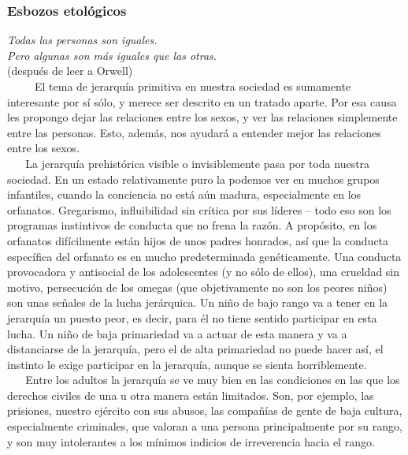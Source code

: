 \protect\hypertarget{M23}{}{}

\hypertarget{esbozos-etoluxf3gicos}{\subsubsection{Esbozos etológicos}\label{esbozos-etoluxf3gicos}}

\noindent
\emph{Todas las personas son iguales.\\
Pero algunas son más iguales que las otras.\\}
(después de leer a Orwell)\\



~ ~ ~ El tema de jerarquía primitiva en nuestra sociedad es sumamente
interesante por sí sólo, y merece ser descrito en un tratado aparte. Por
esa causa les propongo dejar las relaciones entre los sexos, y ver las
relaciones simplemente entre las personas. Esto, además, nos ayudará a
entender mejor las relaciones entre los sexos.\\
\hspace*{0.333em} ~ ~ La jerarquía prehistórica visible o invisiblemente
pasa por toda nuestra sociedad. En un estado relativamente puro la
podemos ver en muchos grupos infantiles, cuando la conciencia no está
aún madura, especialmente en los orfanatos. Gregarismo, influibilidad
sin crítica por sus líderes -- todo eso son los programas instintivos de
conducta que no frena la razón. A propósito, en los orfanatos
difícilmente están hijos de unos padres honrados, así que la conducta
específica del orfanato es en mucho predeterminada genéticamente. Una
conducta provocadora y antisocial de los adolescentes (y no sólo de
ellos), una crueldad sin motivo, persecución de los omegas (que
objetivamente no son los peores niños) son unas señales de la lucha
jerárquica. Un niño de bajo rango va a tener en la jerarquía un puesto
peor, es decir, para él no tiene sentido participar en esta lucha. Un
niño de baja primariedad va a actuar de esta manera y va a distanciarse
de la jerarquía, pero el de alta primariedad no puede hacer así, el
instinto le exige participar en la jerarquía, aunque se sienta
horriblemente.\\
\hspace*{0.333em} ~ ~ Entre los adultos la jerarquía se ve muy bien en
las condiciones en las que los derechos civiles de una u otra manera
están limitados. Son, por ejemplo, las prisiones, nuestro ejército con
sus abusos, las compañías de gente de baja cultura, especialmente
criminales, que valoran a una persona principalmente por su rango, y son
muy intolerantes a los mínimos indicios de irreverencia hacia el rango.


